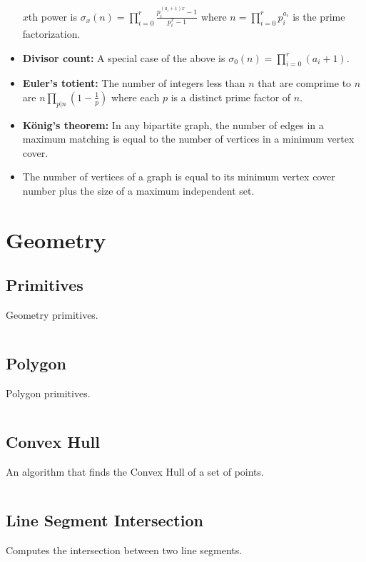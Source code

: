 \documentclass[9pt,a4paper,twocolumn,landscape,oneside]{amsart}
\newcommand{\code}[1]{\inputminted{cpp}{_code/#1}}
\begin{document}
\begin{itemize}
                $x$th power is $\sigma_x(n) = \prod_{i=0}^{r} \frac{p_i^{(a_i +
                1)x} - 1}{p_i^x - 1}$ where $n = \prod_{i=0}^r p_i^{a_i}$ is
                the prime factorization.
            \item \textbf{Divisor count:} A special case of the above is
                $\sigma_0(n) = \prod_{i=0}^r (a_i + 1)$.
            \item \textbf{Euler's totient:} The number of integers less than
                $n$ that are comprime to $n$ are $n\prod_{p|n}\left(1 - \frac{1}{p}\right)$
                where each $p$ is a distinct prime factor of $n$.
            \item \textbf{König's theorem:} In any bipartite graph, the number
                of edges in a maximum matching is equal to the number of
                vertices in a minimum vertex cover.
            \item The number of vertices of a graph is equal to its minimum
                vertex cover number plus the size of a maximum independent set.
        \end{itemize}


\section{Geometry}
    \subsection{Primitives}
        Geometry primitives.
        \code{geometry/primitives.cpp}

    \subsection{Polygon}
        Polygon primitives.
        \code{geometry/polygon.cpp}

    \subsection{Convex Hull}
        An algorithm that finds the Convex Hull of a set of points.
        \code{geometry/convex_hull.cpp}

    \subsection{Line Segment Intersection}
        Computes the intersection between two line segments.
        \code{geometry/line_segment_intersect.cpp}
\end{document}
